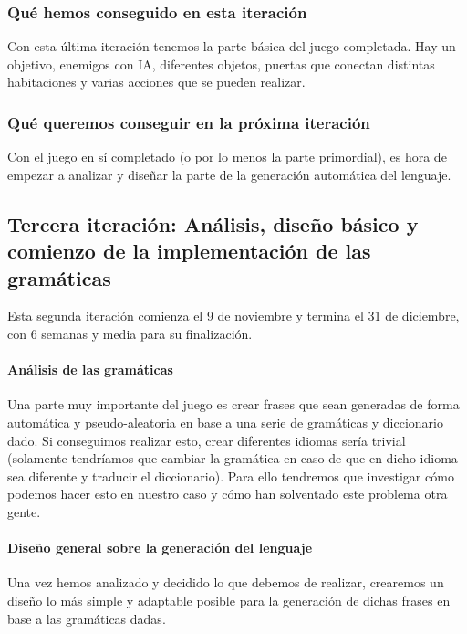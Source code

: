 \subsubsection{Qué hemos conseguido en esta iteración}

Con esta última iteración tenemos la parte básica del juego completada. Hay un objetivo, enemigos con IA, diferentes objetos, puertas que conectan distintas habitaciones y varias acciones que se pueden realizar.

\subsubsection{Qué queremos conseguir en la próxima iteración}

Con el juego en sí completado (o por lo menos la parte primordial), es hora de empezar a analizar y diseñar la parte de la generación automática del lenguaje.

\subsection{Tercera iteración: Análisis, diseño básico y comienzo de la implementación de las gramáticas}

Esta segunda iteración comienza el 9 de noviembre y termina el 31 de diciembre, con 6 semanas y media para su finalización.

\paragraph{Análisis de las gramáticas} Una parte muy importante del juego es crear frases que sean generadas de forma automática y pseudo-aleatoria en base a una serie de gramáticas y diccionario dado. Si conseguimos realizar esto, crear diferentes idiomas sería trivial (solamente tendríamos que cambiar la gramática en caso de que en dicho idioma sea diferente y traducir el diccionario). Para ello tendremos que investigar cómo podemos hacer esto en nuestro caso y cómo han solventado este problema otra gente.

\paragraph{Diseño general sobre la generación del lenguaje} Una vez hemos analizado y decidido lo que debemos de realizar, crearemos un diseño lo más simple y adaptable posible para la generación de dichas frases en base a las gramáticas dadas.

